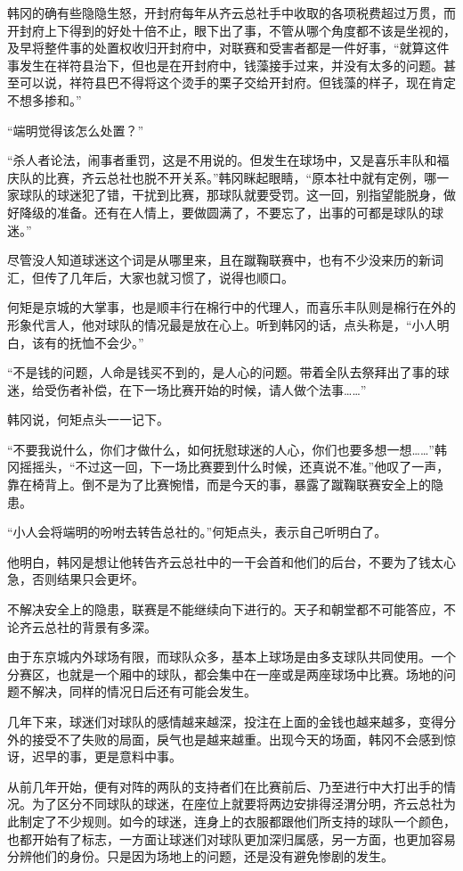 韩冈的确有些隐隐生怒，开封府每年从齐云总社手中收取的各项税费超过万贯，而开封府上下得到的好处十倍不止，眼下出了事，不管从哪个角度都不该是坐视的，及早将整件事的处置权收归开封府中，对联赛和受害者都是一件好事，“就算这件事发生在祥符县治下，但也是在开封府中，钱藻接手过来，并没有太多的问题。甚至可以说，祥符县巴不得将这个烫手的栗子交给开封府。但钱藻的样子，现在肯定不想多掺和。”

“端明觉得该怎么处置？”

“杀人者论法，闹事者重罚，这是不用说的。但发生在球场中，又是喜乐丰队和福庆队的比赛，齐云总社也脱不开关系。”韩冈眯起眼睛，“原本社中就有定例，哪一家球队的球迷犯了错，干扰到比赛，那球队就要受罚。这一回，别指望能脱身，做好降级的准备。还有在人情上，要做圆满了，不要忘了，出事的可都是球队的球迷。”

尽管没人知道球迷这个词是从哪里来，且在蹴鞠联赛中，也有不少没来历的新词汇，但传了几年后，大家也就习惯了，说得也顺口。

何矩是京城的大掌事，也是顺丰行在棉行中的代理人，而喜乐丰队则是棉行在外的形象代言人，他对球队的情况最是放在心上。听到韩冈的话，点头称是，“小人明白，该有的抚恤不会少。”

“不是钱的问题，人命是钱买不到的，是人心的问题。带着全队去祭拜出了事的球迷，给受伤者补偿，在下一场比赛开始的时候，请人做个法事……”

韩冈说，何矩点头一一记下。

“不要我说什么，你们才做什么，如何抚慰球迷的人心，你们也要多想一想……”韩冈摇摇头，“不过这一回，下一场比赛要到什么时候，还真说不准。”他叹了一声，靠在椅背上。倒不是为了比赛惋惜，而是今天的事，暴露了蹴鞠联赛安全上的隐患。

“小人会将端明的吩咐去转告总社的。”何矩点头，表示自己听明白了。

他明白，韩冈是想让他转告齐云总社中的一干会首和他们的后台，不要为了钱太心急，否则结果只会更坏。

不解决安全上的隐患，联赛是不能继续向下进行的。天子和朝堂都不可能答应，不论齐云总社的背景有多深。

由于东京城内外球场有限，而球队众多，基本上球场是由多支球队共同使用。一个分赛区，也就是一个厢中的球队，都会集中在一座或是两座球场中比赛。场地的问题不解决，同样的情况日后还有可能会发生。

几年下来，球迷们对球队的感情越来越深，投注在上面的金钱也越来越多，变得分外的接受不了失败的局面，戾气也是越来越重。出现今天的场面，韩冈不会感到惊讶，迟早的事，更是意料中事。

从前几年开始，便有对阵的两队的支持者们在比赛前后、乃至进行中大打出手的情况。为了区分不同球队的球迷，在座位上就要将两边安排得泾渭分明，齐云总社为此制定了不少规则。如今的球迷，连身上的衣服都跟他们所支持的球队一个颜色，也都开始有了标志，一方面让球迷们对球队更加深归属感，另一方面，也更加容易分辨他们的身份。只是因为场地上的问题，还是没有避免惨剧的发生。

